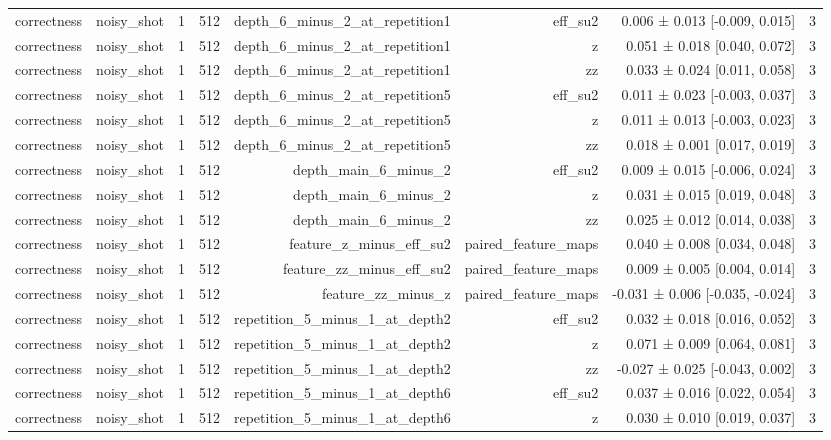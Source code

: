 \begin{table}
\begin{tabular}{lrrrrrrr}
correctness & noisy\_shot & 1 & 512 & depth\_6\_minus\_2\_at\_repetition1 & eff\_su2 & 0.006 ± 0.013 [-0.009, 0.015] & 3 \\
correctness & noisy\_shot & 1 & 512 & depth\_6\_minus\_2\_at\_repetition1 & z & 0.051 ± 0.018 [0.040, 0.072] & 3 \\
correctness & noisy\_shot & 1 & 512 & depth\_6\_minus\_2\_at\_repetition1 & zz & 0.033 ± 0.024 [0.011, 0.058] & 3 \\
correctness & noisy\_shot & 1 & 512 & depth\_6\_minus\_2\_at\_repetition5 & eff\_su2 & 0.011 ± 0.023 [-0.003, 0.037] & 3 \\
correctness & noisy\_shot & 1 & 512 & depth\_6\_minus\_2\_at\_repetition5 & z & 0.011 ± 0.013 [-0.003, 0.023] & 3 \\
correctness & noisy\_shot & 1 & 512 & depth\_6\_minus\_2\_at\_repetition5 & zz & 0.018 ± 0.001 [0.017, 0.019] & 3 \\
correctness & noisy\_shot & 1 & 512 & depth\_main\_6\_minus\_2 & eff\_su2 & 0.009 ± 0.015 [-0.006, 0.024] & 3 \\
correctness & noisy\_shot & 1 & 512 & depth\_main\_6\_minus\_2 & z & 0.031 ± 0.015 [0.019, 0.048] & 3 \\
correctness & noisy\_shot & 1 & 512 & depth\_main\_6\_minus\_2 & zz & 0.025 ± 0.012 [0.014, 0.038] & 3 \\
correctness & noisy\_shot & 1 & 512 & feature\_z\_minus\_eff\_su2 & paired\_feature\_maps & 0.040 ± 0.008 [0.034, 0.048] & 3 \\
correctness & noisy\_shot & 1 & 512 & feature\_zz\_minus\_eff\_su2 & paired\_feature\_maps & 0.009 ± 0.005 [0.004, 0.014] & 3 \\
correctness & noisy\_shot & 1 & 512 & feature\_zz\_minus\_z & paired\_feature\_maps & -0.031 ± 0.006 [-0.035, -0.024] & 3 \\
correctness & noisy\_shot & 1 & 512 & repetition\_5\_minus\_1\_at\_depth2 & eff\_su2 & 0.032 ± 0.018 [0.016, 0.052] & 3 \\
correctness & noisy\_shot & 1 & 512 & repetition\_5\_minus\_1\_at\_depth2 & z & 0.071 ± 0.009 [0.064, 0.081] & 3 \\
correctness & noisy\_shot & 1 & 512 & repetition\_5\_minus\_1\_at\_depth2 & zz & -0.027 ± 0.025 [-0.043, 0.002] & 3 \\
correctness & noisy\_shot & 1 & 512 & repetition\_5\_minus\_1\_at\_depth6 & eff\_su2 & 0.037 ± 0.016 [0.022, 0.054] & 3 \\
correctness & noisy\_shot & 1 & 512 & repetition\_5\_minus\_1\_at\_depth6 & z & 0.030 ± 0.010 [0.019, 0.037] & 3 \\

\end{tabular}
\end{table}
